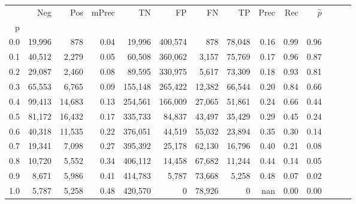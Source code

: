 \begin{tabular}{rrrrrrrrrrrrrr}
\toprule
{} &     Neg &     Pos & mPrec &       TN &       FP &      FN &      TP &  Prec &   Rec & $\hat{p}$ \\
p   &         &         &       &          &          &         &         &       &       &           \\
\midrule
0.0 &  19,996 &     878 &  0.04 &   19,996 &  400,574 &     878 &  78,048 &  0.16 &  0.99 &      0.96 \\
0.1 &  40,512 &   2,279 &  0.05 &   60,508 &  360,062 &   3,157 &  75,769 &  0.17 &  0.96 &      0.87 \\
0.2 &  29,087 &   2,460 &  0.08 &   89,595 &  330,975 &   5,617 &  73,309 &  0.18 &  0.93 &      0.81 \\
0.3 &  65,553 &   6,765 &  0.09 &  155,148 &  265,422 &  12,382 &  66,544 &  0.20 &  0.84 &      0.66 \\
0.4 &  99,413 &  14,683 &  0.13 &  254,561 &  166,009 &  27,065 &  51,861 &  0.24 &  0.66 &      0.44 \\
0.5 &  81,172 &  16,432 &  0.17 &  335,733 &   84,837 &  43,497 &  35,429 &  0.29 &  0.45 &      0.24 \\
0.6 &  40,318 &  11,535 &  0.22 &  376,051 &   44,519 &  55,032 &  23,894 &  0.35 &  0.30 &      0.14 \\
0.7 &  19,341 &   7,098 &  0.27 &  395,392 &   25,178 &  62,130 &  16,796 &  0.40 &  0.21 &      0.08 \\
0.8 &  10,720 &   5,552 &  0.34 &  406,112 &   14,458 &  67,682 &  11,244 &  0.44 &  0.14 &      0.05 \\
0.9 &   8,671 &   5,986 &  0.41 &  414,783 &    5,787 &  73,668 &   5,258 &  0.48 &  0.07 &      0.02 \\
1.0 &   5,787 &   5,258 &  0.48 &  420,570 &        0 &  78,926 &       0 &   nan &  0.00 &      0.00 \\
\bottomrule
\end{tabular}
